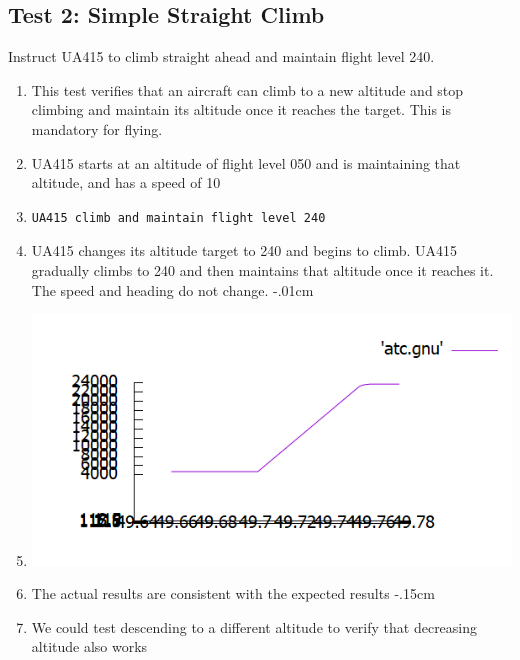 \documentclass[letterpaper, 12pt]{article}
\begin{document}
\subsection{Test 2: Simple Straight Climb}
Instruct UA415 to climb straight ahead and maintain flight level 240.
\begin{enumerate}\itemsep-.15cm
\item This test verifies that an aircraft can climb to a new altitude and stop climbing and maintain its altitude once it reaches the target. This is mandatory for flying.
\item UA415 starts at an altitude of flight level 050 and is maintaining that altitude, and has a speed of 10
\item \begin{verbatim}UA415 climb and maintain flight level 240
\end{verbatim}
\item UA415 changes its altitude target to 240 and begins to climb. UA415 gradually climbs to 240 and then maintains that altitude once it reaches it. The speed and heading do not change.
\itemsep-.01cm
\item \includegraphics[scale=.55,valign=t,center]{test2.png}
\item The actual results are consistent with the expected results
\itemsep-.15cm
\item We could test descending to a different altitude to verify that decreasing altitude also works
\end{enumerate}
\end{document}
